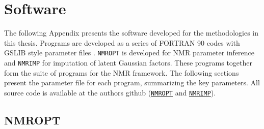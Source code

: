 
\chapter{Software}
\label{ch:software}

The following Appendix presents the software developed for the methodologies in this thesis. Programs are developed as a series of FORTRAN 90 codes with \gls{GSLIB} style parameter files \citep{deutsch1992geostatistical}. \texttt{NMROPT} is developed for \gls{NMR} parameter inference and \texttt{NMRIMP} for imputation of latent Gaussian factors. These programs together form the suite of programs for the \gls{NMR} framework. The following sections present the parameter file for each program, summarizing the key parameters. All source code is available at the authors github (\href{https://github.com/benjiharding/NMROPT}{\texttt{NMROPT}} and \href{https://github.com/benjiharding/NMRIMP}{\texttt{NMRIMP}}).


\section{NMROPT}
\label{sect:nmropt}


